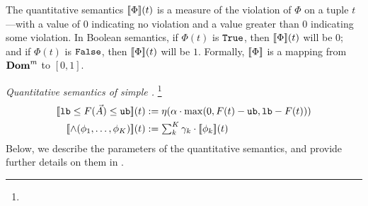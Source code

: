 The quantitative semantics ${[\![{\Phi}]\!]}(t)$ is a measure of the violation of
$\Phi$ on a tuple $t$---with a value of $0$ indicating no violation and a value
greater than 0 indicating some violation. In Boolean semantics, if $\Phi(t)$ is
${\mathtt{True}}$, then ${[\![{\Phi}]\!]}(t)$ will be $0$; and if $\Phi(t)$ is ${\mathtt{False}}$, then
${[\![{\Phi}]\!]}(t)$ will be $1$. Formally, ${[\![{\Phi}]\!]}$ is a mapping from
$\mathbf{Dom}^m$ to $[0,1]$.

\smallskip

\noindent\emph{Quantitative semantics of simple \invariants.} 
%
\footnote{}\label{fn1}
%
\begin{align*}
    {[\![{{\mathtt{lb}}\leq F(\vec{A})\leq {\mathtt{ub}}}]\!]}(t) &:= \eta(\alpha \cdot \max(0, F(t)-{\mathtt{ub}}, {\mathtt{lb}} - F(t)))
    \\
    {[\![{\wedge(\phi_1,\ldots,\phi_K)}]\!]}(t) &:= \textstyle\sum_{k}^{K} \gamma_k \cdot {[\![{\phi_k}]\!]}(t)
\end{align*}
%
Below, we describe the parameters of the quantitative semantics, and provide further details on them in \appOrTechRep.

